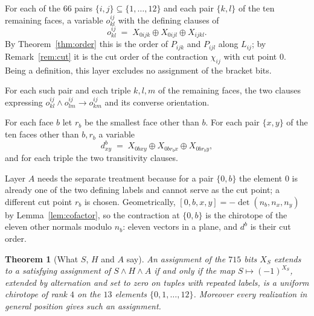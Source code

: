 \documentclass[11pt,reqno]{amsart}
\theoremstyle{plain}
\newtheorem{theorem}{Theorem}[section]
\theoremstyle{definition}
\newcommand{\bra}[1]{[#1]}
\newcommand{\xor}{\oplus}
\DeclareMathOperator{\dett}{det}
\begin{document}
\begin{description}[leftmargin=2.4em,style=nextline]
\item[Layer $S$ (definitions)] For each of the $66$ pairs $\{i,j\}\subseteq\{1,\dots,12\}$ and each
  pair $\{k,l\}$ of the ten remaining faces, a variable $o^{ij}_{kl}$ with the defining clauses of
  \[
     o^{ij}_{kl}\;=\;X_{0ijk}\xor X_{0ijl}\xor X_{ijkl}.
  \]
  By Theorem~\ref{thm:order} this is the order of $P_{ijk}$ and $P_{ijl}$ along $L_{ij}$; by
  Remark~\ref{rem:cut} it is the cut order of the contraction $\chi_{ij}$ with cut point $0$. Being a
  definition, this layer excludes no assignment of the bracket bits.
\item[Layer $H$ (transitivity on the $66$ affine lines)] For each such pair and each triple $k,l,m$ of
  the remaining faces, the two clauses expressing
  $o^{ij}_{kl}\wedge o^{ij}_{lm}\rightarrow o^{ij}_{km}$ and its converse orientation.
\item[Layer $A$ (transitivity on the $12$ lines at infinity)] For each face $b$ let $r_b$ be the
  smallest face other than $b$. For each pair $\{x,y\}$ of the ten faces other than $b,r_b$ a variable
  \[
      d^{b}_{xy}\;=\;X_{0bxy}\xor X_{0b r_b x}\xor X_{0b r_b y},
  \]
  and for each triple the two transitivity clauses.
\end{description}

Layer $A$ needs the separate treatment because for a pair $\{0,b\}$ the element $0$ is already one of
the two defining labels and cannot serve as the cut point; a different cut point $r_b$ is chosen.
Geometrically, $\bra{0,b,x,y}=-\dett(n_b,n_x,n_y)$ by Lemma~\ref{lem:cofactor}, so the contraction at
$\{0,b\}$ is the chirotope of the eleven other normals modulo $n_b$: eleven vectors in a plane, and
$d^b$ is their cut order.

\begin{theorem}[What $S$, $H$ and $A$ say]\label{thm:chirotope}
An assignment of the $715$ bits $X_S$ extends to a satisfying assignment of $S\wedge H\wedge A$ if and
only if the map $S\mapsto(-1)^{X_S}$, extended by alternation and set to zero on tuples with
repeated labels, is a uniform
chirotope of rank $4$ on the $13$ elements $\{0,1,\dots,12\}$. Moreover every realization in general
position gives such an assignment.
\end{theorem}
\end{document}
